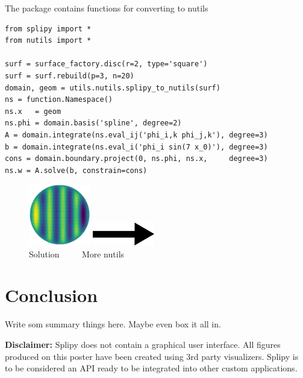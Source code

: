 \documentclass[landscape]{sintefposter}
\begin{document}
\begin{multicols}{3}
\begin{tcolorbox}[colback=white,colframe=sintefblue,title=Integration with Nutils]
  The package contains functions for converting to nutils
  \begin{tcolorbox}[colback=sinteflightgrey]
  \begin{Verbatim}[fontsize=\footnotesize]
from splipy import *
from nutils import *

surf = surface_factory.disc(r=2, type='square')
surf = surf.rebuild(p=3, n=20)
domain, geom = utils.nutils.splipy_to_nutils(surf)
ns = function.Namespace()
ns.x   = geom
ns.phi = domain.basis('spline', degree=2)
A = domain.integrate(ns.eval_ij('phi_i,k phi_j,k'), degree=3)
b = domain.integrate(ns.eval_i('phi_i sin(7 x_0)'), degree=3)
cons = domain.boundary.project(0, ns.phi, ns.x,     degree=3)
ns.w = A.solve(b, constrain=cons)\end{Verbatim}
  \end{tcolorbox}
  \begin{figure}
    \begin{center}
      \includegraphics[width=0.24\textwidth]{nutilssolution}
      \includegraphics[width=0.24\textwidth]{right.png} \\
      Solution $\quad\quad$ More nutils
    \end{center}
  \end{figure}
\end{tcolorbox}

\section{Conclusion}

Write som summary things here.
Maybe even box it all in.

{\footnotesize \textbf{Disclaimer:}
Splipy does not contain a graphical user interface.
All figures produced on this poster have been created using 3rd party visualizers.
Splipy is to be considered an API ready to be integrated into other custom applications.
}

\end{multicols}
\end{document}

